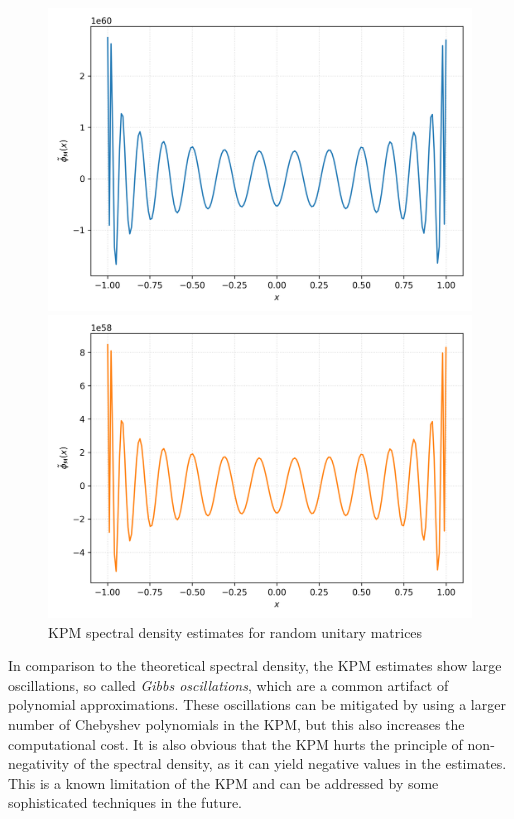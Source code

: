 \begin{figure}[H]
    \centering
    \begin{minipage}{0.49\textwidth}
        \centering
        \includegraphics[width=\textwidth]{Graphics/svd_kpm.png}
    \end{minipage}
    \hfill
    \begin{minipage}{0.49\textwidth}
        \centering
        \includegraphics[width=\textwidth]{Graphics/qr_kpm.png}
    \end{minipage}
    \caption{KPM spectral density estimates for random unitary matrices}
    \label{fig:compare_svd_qr_kpm}
\end{figure}

In comparison to the theoretical spectral density, the KPM estimates show large oscillations, so called \emph{Gibbs oscillations}, which are a common artifact of polynomial approximations. These oscillations can be mitigated by using a larger number of Chebyshev polynomials in the KPM, but this also increases the computational cost. It is also obvious that the KPM hurts the principle of non-negativity of the spectral density, as it can yield negative values in the estimates. This is a known limitation of the KPM and can be addressed by some sophisticated techniques in the future.